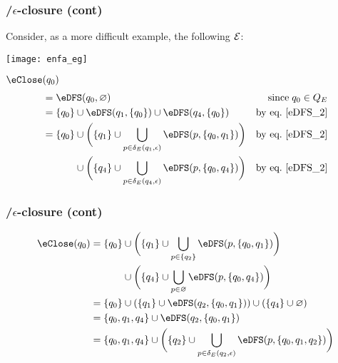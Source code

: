 % 
\begin{frame}
\frametitle{\eNFA{}/\(\epsilon\)-closure (cont)}

Consider, as a more difficult example, the following \eNFA \(\cal E\):
\begin{center}
\texttt{[image: enfa\_eg]}
\end{center}
\(\eClose (q_0)\)
\begin{align*}
  &= \eDFS (q_0, \varnothing) 
  & \text{since} \; q_0 \in Q_E\\
  & = \{q_0\} \cup \eDFS (q_1, \{q_0\}) 
              \cup \eDFS (q_4, \{q_0\})
  & \text{by eq.~\ref{eDFS_2}}\\
  &= \{q_0\} \cup \biggl( \{q_1\} \cup \bigcup_{p \in
                \delta_E(q_1,\epsilon)}{\eDFS (p, \{q_0,
                q_1\})}\biggr)
  & \text{by eq.~\ref{eDFS_2}}\\
  &\mathrel{\phantom{=}} \phantom{\{q_0\}}{} 
   \cup \biggl( \{q_4\} \cup \bigcup_{p \in
     \delta_E(q_4,\epsilon)}{\eDFS (p, \{q_0, q_4\})}
   \biggr)
  & \text{by eq.~\ref{eDFS_2}}
\end{align*}

\end{frame}

% 
\begin{frame}
\frametitle{\eNFA{}/\(\epsilon\)-closure (cont)}

\begin{align*}
\eClose (q_0)
  &= \{q_0\} \cup \biggl( \{q_1\} \cup \bigcup_{p \in
                \{q_2\}}{\eDFS (p, \{q_0, q_1\})}\biggr)\\
  &\mathrel{\phantom{=}} \phantom{\{q_0\}}{} 
   \cup \biggl( \{q_4\} \cup \bigcup_{p \in \varnothing}{\eDFS (p,
     \{q_0, q_4\})} \biggr)\\
  &= \{q_0\} \cup (\{q_1\} \cup \eDFS (q_2, \{q_0, q_1\}))
     \cup (\{q_4\} \cup \varnothing)\\
  &= \{q_0, q_1, q_4\} \cup \eDFS (q_2, \{q_0, q_1\})\\
  &= \{q_0, q_1, q_4\} \cup \biggl(\{q_2\} \cup \bigcup_{p \in
       \delta_E(q_2,\epsilon)}{\eDFS (p, \{q_0, q_1,
       q_2\})}\biggr)
\end{align*}

\end{frame}


